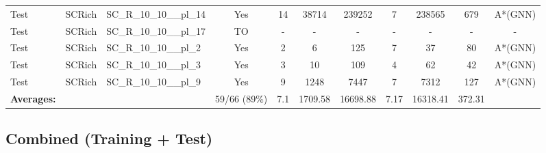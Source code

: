 \documentclass{article}
\begin{document}
\begin{tabular}{lllcccccccc}
Test & SCRich & SC\_R\_10\_10\_\_pl\_14 & Yes & 14 & 38714 & 239252 & 7 & 238565 & 679 & A*(GNN) \\
Test & SCRich & SC\_R\_10\_10\_\_pl\_17 & TO & - & - & - & - & - & - & - \\
Test & SCRich & SC\_R\_10\_10\_\_pl\_2 & Yes & 2 & 6 & 125 & 7 & 37 & 80 & A*(GNN) \\
Test & SCRich & SC\_R\_10\_10\_\_pl\_3 & Yes & 3 & 10 & 109 & 4 & 62 & 42 & A*(GNN) \\
Test & SCRich & SC\_R\_10\_10\_\_pl\_9 & Yes & 9 & 1248 & 7447 & 7 & 7312 & 127 & A*(GNN) \\
\textbf{Averages:} & & & 59/66 (89\%) & 7.1 & 1709.58 & 16698.88 & 7.17 & 16318.41 & 372.31 & \\
\bottomrule
\end{tabular}
\newpage
\subsection*{Combined (Training + Test)}
\end{document}
